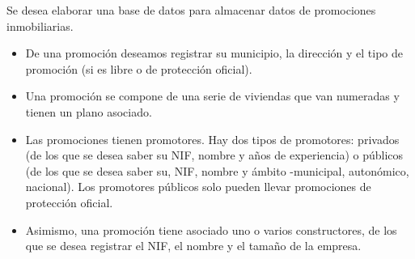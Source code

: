 \begin{ejercicio} \label{ej:19}
    Se desea elaborar una base de datos para almacenar datos de promociones inmobiliarias.
    \begin{itemize}
        \item De una promoción deseamos registrar su municipio, la dirección y el tipo de promoción (si es libre o
        de protección oficial).
        \item Una promoción se compone de una serie de viviendas que van numeradas y tienen un plano asociado.
        \item Las promociones tienen promotores. Hay dos tipos de promotores: privados (de los que se desea saber
        su NIF, nombre y años de experiencia) o públicos (de los que se desea saber su, NIF, nombre y ámbito
        -municipal, autonómico, nacional). Los promotores públicos solo pueden llevar promociones de
        protección oficial.
        \item Asimismo, una promoción tiene asociado uno o varios constructores, de los que se desea registrar el
        NIF, el nombre y el tamaño de la empresa.
    \end{itemize}
\end{ejercicio}

